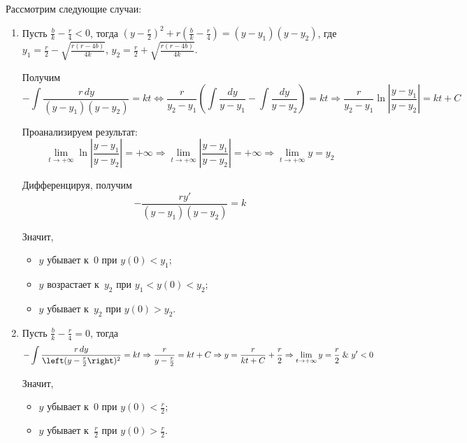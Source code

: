 Рассмотрим следующие случаи:
\begin{enumerate}
	\item Пусть $\frac{b}k - \frac{r}4 < 0$, тогда
	$\left( y - \frac{r}2 \right)^2 + r\left( \frac{b}k - \frac{r}4 \right) = (y - y_1)(y - y_2)$, где
	$y_1 = \frac{r}2 - \sqrt{\frac{r(r - 4b)}{4k}}$,
	$y_2 = \frac{r}2 + \sqrt{\frac{r(r - 4b)}{4k}}$.
	
	Получим
	\begin{equation*}
	-\int \frac{r\,dy}{(y - y_1)(y - y_2)} = kt \Leftrightarrow
	\frac{r}{y_2 - y_1} \left( \int \frac{dy}{y - y_1} - \int \frac{dy}{y - y_2} \right) = kt \Rightarrow
	\frac{r}{y_2 - y_1} \ln \left| \frac{y - y_1}{y - y_2} \right| = kt + C
	\end{equation*}
	
	Проанализируем результат:
	\begin{equation*}
	\lim_{t \to +\infty} \ln \left| \frac{y - y_1}{y - y_2} \right| = +\infty \Rightarrow
	\lim_{t \to +\infty} \left| \frac{y - y_1}{y - y_2} \right| = +\infty \Rightarrow
	\lim_{t \to +\infty} y = y_2
	\end{equation*}
	
	Дифференцируя, получим
	\begin{equation*}
	-\frac{ry'}{(y - y_1)(y - y_2)} = k
	\end{equation*}
	
	Значит,
	\begin{itemize}
		\item $y$ убывает к~$0$ при $y(0) < y_1$;
		\item $y$ возрастает к~$y_2$ при $y_1 < y(0) < y_2$;
		\item $y$ убывает к~$y_2$ при $y(0) > y_2$.
	\end{itemize}
	
	\item Пусть $\frac{b}k - \frac{r}4 = 0$, тогда
	\begin{equation*}
	-\int \frac{r\,dy}{\left( y - \frac{r}2 \right)^2} = kt \Rightarrow
	\frac{r}{y - \frac{r}2} = kt + C \Rightarrow
	y = \frac{r}{kt + C} + \frac{r}2 \Rightarrow
	\lim_{t \to +\infty} y = \frac{r}2 \lAnd y' < 0
	\end{equation*}
	
	Значит,
	\begin{itemize}
		\item $y$ убывает к~$0$ при $y(0) < \frac{r}2$;
		\item $y$ убывает к~$\frac{r}2$ при $y(0) > \frac{r}2$.
	\end{itemize}
	

\end{enumerate}
